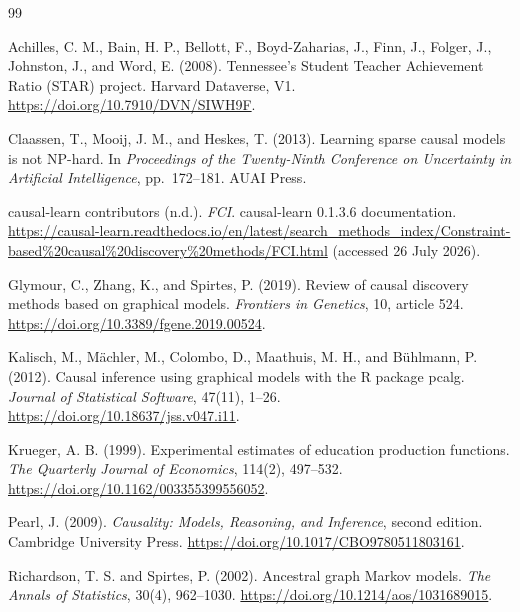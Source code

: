 \documentclass[11pt,a4paper]{article}
\theoremstyle{definition}
\begin{document}
\footnotesize
\setlength{\bibsep}{2pt}

\begin{thebibliography}{99}

Achilles, C. M., Bain, H. P., Bellott, F., Boyd-Zaharias, J., Finn, J.,
Folger, J., Johnston, J., and Word, E. (2008).
Tennessee's Student Teacher Achievement Ratio (STAR) project.
Harvard Dataverse, V1. \url{https://doi.org/10.7910/DVN/SIWH9F}.

Claassen, T., Mooij, J. M., and Heskes, T. (2013).
Learning sparse causal models is not NP-hard.
In \textit{Proceedings of the Twenty-Ninth Conference on Uncertainty in
Artificial Intelligence}, pp.~172--181. AUAI Press.

causal-learn contributors (n.d.).
\textit{FCI}. causal-learn 0.1.3.6 documentation.
\url{https://causal-learn.readthedocs.io/en/latest/search_methods_index/Constraint-based%20causal%20discovery%20methods/FCI.html}
(accessed 26 July 2026).

Glymour, C., Zhang, K., and Spirtes, P. (2019).
Review of causal discovery methods based on graphical models.
\textit{Frontiers in Genetics}, 10, article 524.
\url{https://doi.org/10.3389/fgene.2019.00524}.

Kalisch, M., M{\"a}chler, M., Colombo, D., Maathuis, M. H., and
B{\"u}hlmann, P. (2012).
Causal inference using graphical models with the R package pcalg.
\textit{Journal of Statistical Software}, 47(11), 1--26.
\url{https://doi.org/10.18637/jss.v047.i11}.

Krueger, A. B. (1999).
Experimental estimates of education production functions.
\textit{The Quarterly Journal of Economics}, 114(2), 497--532.
\url{https://doi.org/10.1162/003355399556052}.

Pearl, J. (2009).
\textit{Causality: Models, Reasoning, and Inference}, second edition.
Cambridge University Press. \url{https://doi.org/10.1017/CBO9780511803161}.

Richardson, T. S. and Spirtes, P. (2002).
Ancestral graph Markov models.
\textit{The Annals of Statistics}, 30(4), 962--1030.
\url{https://doi.org/10.1214/aos/1031689015}.


\end{thebibliography}
\end{document}
